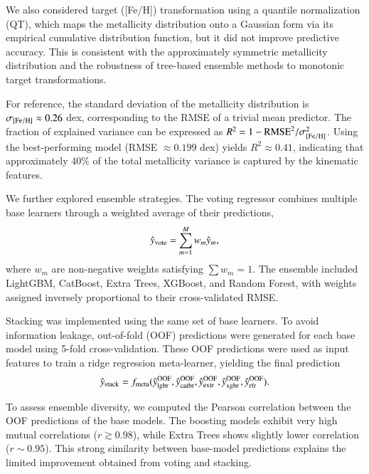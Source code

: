 \documentclass{aa}
\begin{document}
\begin{appendix}
We also considered target ([Fe/H]) transformation using a quantile normalization (QT), which maps the metallicity distribution onto a Gaussian form via its empirical cumulative distribution function, but it did not improve predictive accuracy. This is consistent with the approximately symmetric metallicity distribution and the robustness of tree-based ensemble methods to monotonic target transformations.

For reference, the standard deviation of the metallicity distribution is $\sigma_{\rm [Fe/H]} \approx 0.26$ dex, corresponding to the RMSE of a trivial mean predictor. The fraction of explained variance can be expressed as $R^2 = 1 - \mathrm{RMSE}^2 / \sigma_{\rm [Fe/H]}^2$. Using the best-performing model (RMSE $\approx 0.199$ dex) yields $R^2 \approx 0.41$, indicating that approximately 40\% of the total metallicity variance is captured by the kinematic features.

We further explored ensemble strategies. The voting regressor combines multiple base learners through a weighted average of their predictions,
\begin{equation}
\hat{y}_{\rm vote} = \sum_{m=1}^{M} w_m \hat{y}_m ,
\end{equation}
where $w_m$ are non-negative weights satisfying $\sum w_m = 1$. The ensemble included LightGBM, CatBoost, Extra Trees, XGBoost, and Random Forest, with weights assigned inversely proportional to their cross-validated RMSE.

Stacking was implemented using the same set of base learners. To avoid information leakage, out-of-fold (OOF) predictions were generated for each base model using 5-fold cross-validation. These OOF predictions were used as input features to train a ridge regression meta-learner, yielding the final prediction
\begin{equation}
\hat{y}_{\rm stack} = f_{\rm meta}(\hat{y}_{\rm lgbr}^{\rm OOF},
\hat{y}_{\rm catbr}^{\rm OOF},
\hat{y}_{\rm extr}^{\rm OOF},
\hat{y}_{\rm xgbr}^{\rm OOF},
\hat{y}_{\rm rfr}^{\rm OOF}) .
\end{equation}

To assess ensemble diversity, we computed the Pearson correlation between the OOF predictions of the base models. The boosting models exhibit very high mutual correlations ($r \gtrsim 0.98$), while Extra Trees shows slightly lower correlation ($r \sim 0.95$). This strong similarity between base-model predictions explains the limited improvement obtained from voting and stacking.



\end{appendix}
\end{document}
